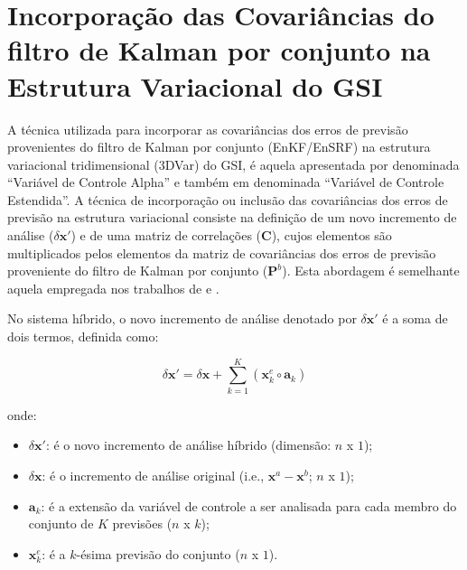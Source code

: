 \section{Incorporação das Covariâncias do filtro de Kalman por conjunto na Estrutura Variacional do GSI}

A técnica utilizada para incorporar as covariâncias dos erros de previsão provenientes do filtro de Kalman por conjunto (EnKF/EnSRF) na estrutura variacional tridimensional (3DVar) do GSI, é aquela apresentada por  denominada ``Variável de Controle Alpha'' e também em  denominada ``Variável de Controle Estendida''. A técnica de incorporação ou inclusão das covariâncias dos erros de previsão na estrutura variacional consiste na definição de um novo incremento de análise ($\delta{\mathbf{x}}'$) e de uma matriz de correlações ($\mathbf{C}$), cujos elementos são multiplicados pelos elementos da matriz de covariâncias dos erros de previsão proveniente do filtro de Kalman por conjunto ($\mathbf{P}^{b}$). Esta abordagem é semelhante aquela empregada nos trabalhos de  e . 

No sistema híbrido, o novo incremento de análise denotado por $\delta{\mathbf{x}}'$ é a soma de dois termos, definida como:

\begin{equation}
\label{eq:29}
\delta{\mathbf{x}'} = \delta{\mathbf{x}} + \sum_{k=1}^{K}{(\mathbf{x}_{k}^{e} \circ \mathbf{a}_{k})}
\end{equation}

onde:

\begin{itemize}
    \item $\delta{\mathbf{x}'}$: é o novo incremento de análise híbrido (dimensão: $n$ x $1$);
    \item $\delta{\mathbf{x}}$: é o incremento de análise original (i.e., $\mathbf{x}^{a}-\mathbf{x}^{b}$; $n$ x $1$);
    \item $\mathbf{a}_{k}$: é a extensão da variável de controle a ser analisada para cada membro do conjunto de $K$ previsões ($n$ x $k$);
    \item $\mathbf{x}_{k}^{e}$: é a $k$-ésima previsão do conjunto ($n$ x $1$).
\end{itemize}

